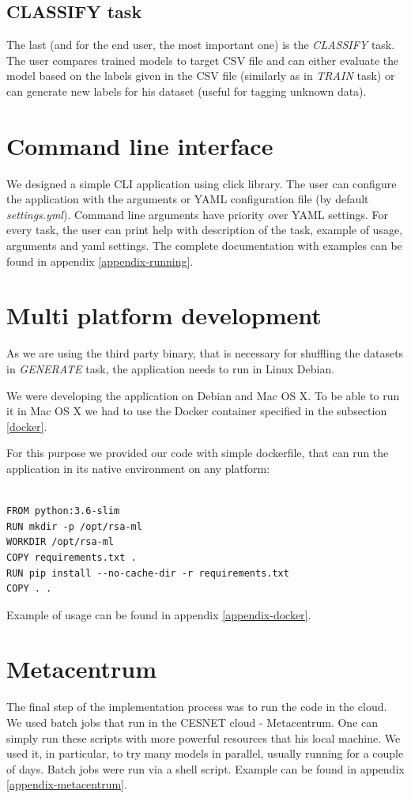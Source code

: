 \subsection{CLASSIFY task}

The last (and for the end user, the most important one) is the \textit{CLASSIFY} task. The user compares trained models to target CSV file and can either evaluate the model based on the labels given in the CSV file (similarly as in \textit{TRAIN} task) or can generate new labels for his dataset (useful for tagging unknown data).

\section{Command line interface}
\label{cli}

We designed a simple CLI application using click library. The user can configure the application with the arguments or YAML configuration file (by default \textit{settings.yml}). Command line arguments have priority over YAML settings. For every task, the user can print help with description of the task, example of usage, arguments and yaml settings. The complete documentation with examples can be found in appendix \ref{appendix-running}.

\section{Multi platform development}

As we are using the third party binary, that is necessary for shuffling the datasets in \textit{GENERATE} task, the application needs to run in Linux Debian.

We were developing the application on Debian and Mac OS X. To be able to run it in Mac OS X we had to use the Docker container specified in the subsection \ref{docker}.

For this purpose we provided our code with simple dockerfile, that can run the application in its native environment on any platform:

\begin{verbatim}

FROM python:3.6-slim
RUN mkdir -p /opt/rsa-ml
WORKDIR /opt/rsa-ml
COPY requirements.txt .
RUN pip install --no-cache-dir -r requirements.txt
COPY . .

\end{verbatim}

\noindent
Example of usage can be found in appendix \ref{appendix-docker}.

\section{Metacentrum}

The final step of the implementation process was to run the code in the cloud. We used batch jobs\cite{metacentrum} that run in the CESNET cloud - Metacentrum. One can simply run these scripts with more powerful resources that his local machine. We used it, in particular, to try many models in parallel, usually running for a couple of days. Batch jobs were run via a shell script. Example can be found in appendix \ref{appendix-metacentrum}.
